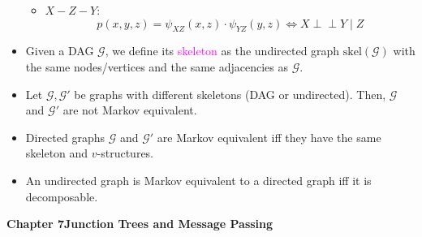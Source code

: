 \documentclass[UTF8]{book}
\newcommand{\perpp}{\ensuremath{\perp\!\!\!\!\!\perp}}
\newcommand{\concept}[1]{\textcolor{magenta}{#1}}
\begin{document}
\begin{itemize}
\begin{itemize}
$$	$$
	\item $X-Z-Y$:
	$$
		p(x,y,z) = \psi_{XZ}(x,z)\cdot\psi_{YZ}(y,z) \Leftrightarrow X\perpp Y\mid Z	
	$$
\end{itemize}
\item Given a DAG $\mathcal{G}$, we define its \concept{skeleton} as the undirected graph $\mathrm{skel}(\mathcal{G})$ with the same nodes/vertices and the same adjacencies as $\mathcal{G}$.
\item Let $\mathcal{G},\mathcal{G}'$ be graphs with different skeletons (DAG or undirected). Then, $\mathcal{G}$ and $\mathcal{G}'$ are not Markov equivalent. 
\item Directed graphs $\mathcal{G}$ and $\mathcal{G}'$ are Markov equivalent iff they have the same skeleton and $v$-structures.
\item An undirected graph is Markov equivalent to a directed graph iff it is decomposable.
\end{itemize}
\large{\textbf{Chapter 7\quad Junction Trees and Message Passing}}
\end{document}
